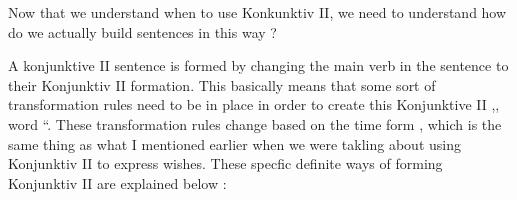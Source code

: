 \documentclass[a4paper,twocolumn,10pt]{article}
\newcommand{\newpar}
{\par \vspace{0.3cm}}
\begin{document}

Now that we understand when to use Konkunktiv II, we need to understand how do
we actually build sentences in this way ?\newpar

A konjunktive II sentence is formed by changing the main verb in the sentence to
their Konjunktiv II formation. This basically means that some sort of
transformation rules need to be in place in order to create this Konjunktive II
,, word ``. These transformation rules change based on the time form , which is
the same thing as what I mentioned earlier when we were takling about using
Konjunktiv II to express wishes. These specfic definite ways of forming
Konjunktiv II are explained below :\newpar

\end{document}
